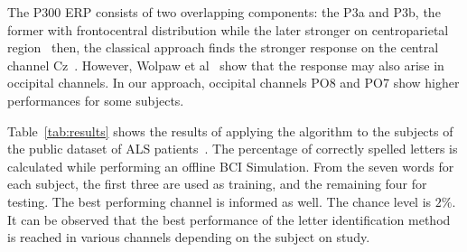 \documentclass[utf8]{frontiersSCNS} %
\begin{document}
%

The P300 ERP  consists of two overlapping components: the P3a and P3b, the former with frontocentral distribution while the later stronger on centroparietal region~\citep{Polich2007} then, the classical approach finds the stronger response on the central channel Cz~\citep{Riccio2013}. However, Wolpaw et al~\citep{Krusienski2006} show that the response may also arise in occipital channels.  In our approach, occipital channels PO8 and PO7 show higher performances for some subjects. %


Table~\ref{tab:results} shows the results of applying the algorithm to the subjects of the public dataset of ALS patients~\citep{Riccio2013}. The percentage of correctly spelled letters is calculated while performing an offline BCI Simulation.  From the seven words for each subject, the first three are used as training, and the remaining four for testing.  The best performing channel is informed as well. The chance level is $2\%$.  It can be observed that the best performance of the letter identification method is reached in various channels depending on the subject on study. 
\end{document}
